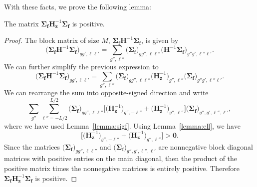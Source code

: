 With these facts, we prove the following lemma:

\begin{lemma}
	The matrix $\mathbf{\Sigma_{f}}\mathbf{H}_{\mathbf{z}}^{-1}\mathbf{\Sigma_{f}}$ is positive.
	\label{lemma:FiHF}
\end{lemma}

\begin{proof}
	The block matrix of size $M$, $\mathbf{\Sigma_{f}} \mathbf{H}^{-1} \mathbf{\Sigma_{f}}$, is given by
	\begin{equation}
		\big ( \mathbf{\Sigma_{f}} \mathbf{H}^{-1} \mathbf{\Sigma_{f}} \big )_{gg',\ell \ell'} = \sum_{g'', \ell''} \big (\mathbf{\Sigma_{f}} \big )_{gg'',\ell \ell''} \big (\mathbf{H}^{-1} \mathbf{\Sigma_{f}} \big )_{g''g',\ell''\ell'}.
	\end{equation}
We can further simplify the previous expression to
	\begin{equation}
		\big ( \mathbf{\Sigma_{f}} \mathbf{H}^{-1} \mathbf{\Sigma_{f}} \big )_{gg',\ell \ell'} = \sum_{g'',\ell''} \big ( \mathbf{\Sigma_{f}} \big )_{gg'',\ell \ell''} \big ( \mathbf{H}_{\mathbf{z}}^{-1} \big )_{g'',\ell''} \big ( \mathbf{\Sigma_{f}} \big )_{g''g',\ell''\ell'}.
	\end{equation}
	We can rearrange the sum into opposite-signed direction and write
	\begin{equation}
		\sum_{g''} \sum_{\ell''=-L/2}^{L/2} \big ( \mathbf{\Sigma_{f}} \big )_{gg'',\ell\ell''} \bigg [ \big ( \mathbf{H}_{\mathbf{z}}^{-1} \big )_{g'',-\ell''} + \big ( \mathbf{H}_{\mathbf{z}}^{-1} \big )_{g'',\ell''} \bigg ] \big ( \mathbf{\Sigma_{f}} \big )_{g'',g',\ell'',\ell'},
	\end{equation}
	where we have used Lemma~\ref{lemma:sigf}. Using Lemma~\ref{lemma:ell}, we have
		\begin{equation}
			\bigg [ \big ( \mathbf{H}_{\mathbf{z}}^{-1} \big )_{g'',-\ell''} + \big ( \mathbf{H}_{\mathbf{z}}^{-1} \big )_{g'',\ell''} \bigg ] > \mathbf{0}. 		\end{equation}
			Since the matrices $\big ( \mathbf{\Sigma_{f}} \big )_{gg'',\ell\ell''}$ and $ \big ( \mathbf{\Sigma_{f}} \big )_{g'',g',\ell'',\ell'}$ are nonnegative block diagonal matrices with positive entries on the main diagonal, then the product of the positive matrix times the nonnegative matrices is entirely positive. Therefore $\mathbf{\Sigma_{f}}\mathbf{H}_{\mathbf{z}}^{-1}\mathbf{\Sigma_{f}}$ is positive. 
\end{proof}

